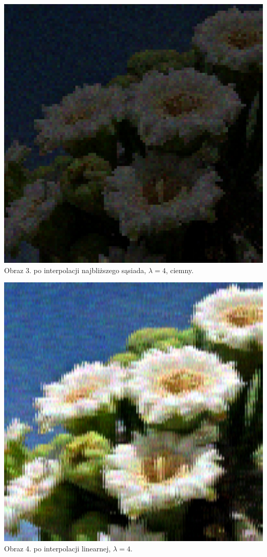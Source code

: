 \documentclass[14pt]{article}
\begin{document}
\begin{center}
    \vspace{0.5cm}
    \includegraphics[scale=0.15]{images/Poisson_nearest_dark_4x.jpg}
    \\ \small Obraz 3. po interpolacji najbliższego sąsiada, 
    $\lambda = 4$, ciemny.

    \vspace{0.5cm}
    \includegraphics[scale=0.15]{images/Poisson_bilinear_4x.jpg}
    \\ \small Obraz 4. po interpolacji linearnej, 
    $\lambda = 4$.


\end{center}
\end{document}
